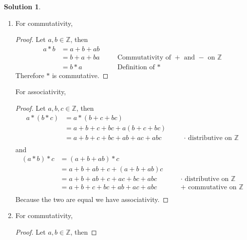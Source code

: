 \documentclass[10pt]{article}
\theoremstyle{definition}
\newtheorem{soln}{Solution}
\newcommand{\justif}[2]{&{#1}&\text{#2}}
\begin{document}
\begin{soln}~
  \begin{enumerate}[label=(\alph*)]
    \item For commutativity,
          \begin{proof}
            Let $a,b\in\mathbb{Z}$, then
            \begin{align*}
              a*b & = a+b+ab                                                            \\
                  & =b+a+ba\justif{\quad}{Commutativity of $+$ and $-$ on $\mathbb{Z}$} \\
                  & =b*a\justif{\quad}{Definition of $*$}
            \end{align*}
            Therefore $*$ is commutative. \qedhere
          \end{proof}
          For associativity,
          \begin{proof}
            Let $a,b,c\in\mathbb{Z}$, then
            \begin{align*}
              a*(b*c) & = a*(b+c+bc)                                                                 \\
                      & = a + b+c+bc + a(b+c+bc)                                                     \\
                      & = a + b+c+bc + ab+ac+abc\justif{\quad}{$\cdot$ distributive on $\mathbb{Z}$} \\
            \end{align*}
            and
            \begin{align*}
              (a*b)*c & = (a+b+ab)*c                                                                  \\
                      & = a+b+ab + c + (a+b+ab)c                                                      \\
                      & = a+b+ab + c + ac+bc+abc \justif{\quad}{$\cdot$ distributive on $\mathbb{Z}$} \\
                      & = a+b+c+ bc + ab+ac+abc \justif{\quad}{$+$ commutative on $\mathbb{Z}$}       \\
            \end{align*}
            Because the two are equal we have associativity. \qedhere
          \end{proof}
          \newpage
    \item For commutativity,
          \begin{proof}
            Let $a,b\in\mathbb{Z}$, then

\end{proof}
\end{enumerate}
\end{soln}
\end{document}
